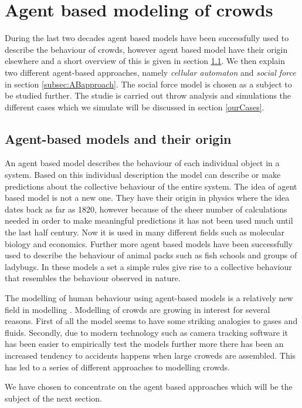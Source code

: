 \section{Agent based modeling of crowds}
\label{sec:crowds}
During the last two decades agent based models have been successfully used to 
describe the behaviour of crowds, however agent based model have their 
origin elsewhere and a short overview of this is given in section \ref{subsec:ABM}. We
then explain two different agent-based approaches, namely \emph{cellular automaton} and \emph{social force} in section \ref{subsec:ABapproach}. The social force model is chosen as a subject to be studied further. The studie is carried out throw analysis and simulations the different cases which we simulate will be discussed in section \ref{ourCases}.

\subsection{Agent-based models and their origin}\label{subsec:ABM}
An agent based model describes the behaviour of each individual object in a system. Based on this individual description the model can describe or make predictions about the collective behaviour of the entire system. The idea of agent based model is not a new one. They have their origin in physics where the idea dates back as far as 1820, however because of the sheer number of calculations needed in order to make meaningful predictions it has not been used much until the last half century\cite{simintro}. Now it is used in many different fields such as molecular biology and economics\cite{MDbio}. Further more agent based models have been successfully used to describe the behaviour of animal packs such as fish schools and groups of ladybugs. In these models a set a simple rules give rise to a collective behaviour that resembles the behaviour observed in nature. 

The modelling of human behaviour using agent-based models is a relatively new field in modelling \cite{helbing00}. Modelling of crowds are growing in interest for several reasons. First of all the model seems to have some striking analogies to gases and fluids. Secondly, due to modern technology such as camera tracking software it has been easier to empirically test the models further more there has been an increased tendency to accidents happens when large croweds are assembled. This has led to a series of different approaches to modelling crowds. 

We have chosen to concentrate on the agent based approaches which will be the subject of the next section.

